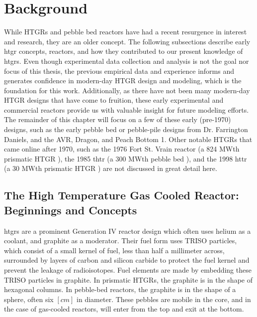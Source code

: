 \section{Background}
\label{sec:intro-background}

While HTGRs and pebble bed reactors have had a recent resurgence in interest and research, they are an older concept.  The following subsections describe early \acrshort{htgr} concepts, reactors, and how they contributed to our present knowledge of \acrshort{htgr}s.  Even though experimental data collection and analysis is not the goal nor focus of this thesis, the previous empirical data and experience informs and generates confidence in modern-day HTGR design and modeling, which is the foundation for this work.  Additionally, as there have not been many modern-day HTGR designs that have come to fruition, these early experimental and commercial reactors provide us with valuable insight for future modeling efforts.  The remainder of this chapter will focus on a few of these early (pre-1970) designs, such as the early pebble bed or pebble-pile designs from Dr. Farrington Daniels, and the AVR, Dragon, and Peach Bottom 1.  Other notable HTGRs that came online after 1970, such as the 1976 Fort St. Vrain reactor (a 824 MWth prismatic HTGR \cite{walker_experience_1978}), the 1985 \acrfull{thtr} (a 300 MWth pebble bed \cite{baumer_construction_1990}), and the 1998 \acrfull{httr} (a 30 MWth prismatic HTGR \cite{shiozawa_overview_2004}) are not discussed in great detail here.

\subsection{The High Temperature Gas Cooled Reactor: Beginnings and Concepts}

\acrshort{htgr}s are a prominent Generation IV reactor design which often uses helium as a coolant, and graphite as a moderator.  Their fuel form uses TRISO particles, which consist of a small kernel of fuel, less than half a millimeter across, surrounded by layers of carbon and silicon carbide to protect the fuel kernel and prevent the leakage of radioisotopes.  Fuel elements are made by embedding these TRISO particles in graphite.  In prismatic HTGRs, the graphite is in the shape of hexagonal columns.  In pebble-bed reactors, the graphite is in the shape of a sphere, often six $\left[cm\right]$ in diameter.  These pebbles are mobile in the core, and in the case of gas-cooled reactors, will enter from the top and exit at the bottom.

